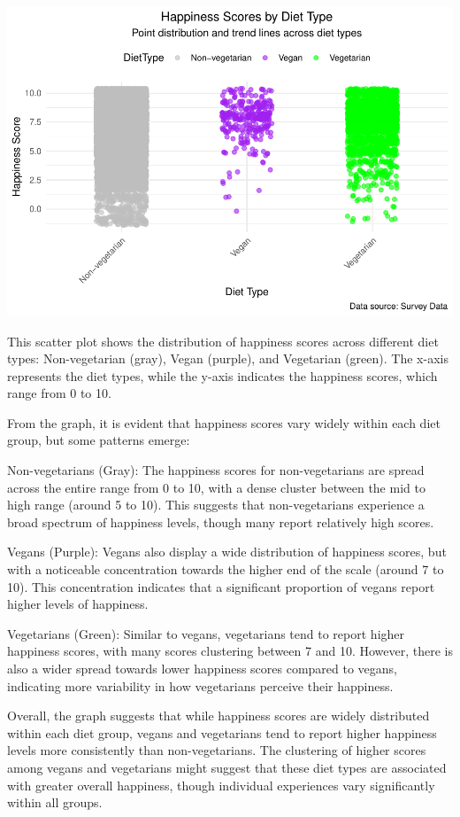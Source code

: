 \documentclass[
]{article}
\begin{document}
\includegraphics{Final-v2_files/figure-latex/Veg~analysis-1.pdf}

This scatter plot shows the distribution of happiness scores across
different diet types: Non-vegetarian (gray), Vegan (purple), and
Vegetarian (green). The x-axis represents the diet types, while the
y-axis indicates the happiness scores, which range from 0 to 10.

From the graph, it is evident that happiness scores vary widely within
each diet group, but some patterns emerge:

Non-vegetarians (Gray): The happiness scores for non-vegetarians are
spread across the entire range from 0 to 10, with a dense cluster
between the mid to high range (around 5 to 10). This suggests that
non-vegetarians experience a broad spectrum of happiness levels, though
many report relatively high scores.

Vegans (Purple): Vegans also display a wide distribution of happiness
scores, but with a noticeable concentration towards the higher end of
the scale (around 7 to 10). This concentration indicates that a
significant proportion of vegans report higher levels of happiness.

Vegetarians (Green): Similar to vegans, vegetarians tend to report
higher happiness scores, with many scores clustering between 7 and 10.
However, there is also a wider spread towards lower happiness scores
compared to vegans, indicating more variability in how vegetarians
perceive their happiness.

Overall, the graph suggests that while happiness scores are widely
distributed within each diet group, vegans and vegetarians tend to
report higher happiness levels more consistently than non-vegetarians.
The clustering of higher scores among vegans and vegetarians might
suggest that these diet types are associated with greater overall
happiness, though individual experiences vary significantly within all
groups.
\end{document}
